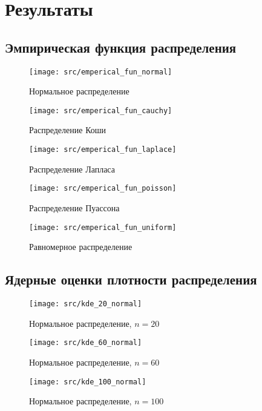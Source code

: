\documentclass[a4paper]{article}
\begin{document}
\section {Результаты}
\subsection{Эмпирическая функция распределения}
	\begin{figure}[H]
	\centering
	\centering
	{\texttt{[image: src/emperical\_fun\_normal]}}
		\caption{Нормальное распределение}
		\label{fig:normal}
	\end{figure}

\begin{figure}[H]
	\centering
	{\texttt{[image: src/emperical\_fun\_cauchy]}}
		\caption{Распределение Коши}
		\label{fig:cauchy}
	\end{figure}

\begin{figure}[H]
	\centering
	{\texttt{[image: src/emperical\_fun\_laplace]}}
		\caption{Распределение Лапласа}
		\label{fig:laplace}
	\end{figure}

\begin{figure}[H]
	\centering
	{\texttt{[image: src/emperical\_fun\_poisson]}}
		\caption{Распределение Пуассона}
		\label{fig:posson}
	\end{figure}

\begin{figure}[H]
	\centering
	{\texttt{[image: src/emperical\_fun\_uniform]}}
		\caption{Равномерное распределение}
		\label{fig:uniform}
	\end{figure}

\subsection{Ядерные оценки плотности распределения}
\begin{figure}[H]
	\centering
	{\texttt{[image: src/kde\_20\_normal]}}
		\caption{Нормальное распределение, $n=20$}
		\label{fig:kde_normal_20}
	\end{figure}

\begin{figure}[H]
	\centering
	{\texttt{[image: src/kde\_60\_normal]}}
		\caption{Нормальное распределение, $n=60$}
		\label{fig:kde_normal_60}
	\end{figure}

\begin{figure}[H]
	\centering
	{\texttt{[image: src/kde\_100\_normal]}}
		\caption{Нормальное распределение, $n=100$}
		\label{fig:kde_normal_100}
	\end{figure}
\end{document}
